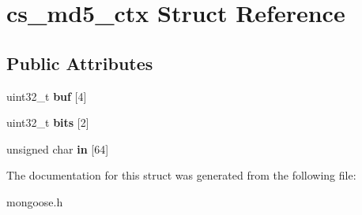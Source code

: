 \hypertarget{structcs__md5__ctx}{}\section{cs\+\_\+md5\+\_\+ctx Struct Reference}
\label{structcs__md5__ctx}
\subsection*{Public Attributes}
\begin{DoxyCompactItemize}
\item 
\mbox{\label{structcs__md5__ctx_abb0fb32f33a62efcd9dc65e3f76cf790}} 
uint32\+\_\+t {\bfseries buf} \mbox{[}4\mbox{]}
\item 
\mbox{\label{structcs__md5__ctx_a598348fc328298a1d8d0ac673d69f749}} 
uint32\+\_\+t {\bfseries bits} \mbox{[}2\mbox{]}
\item 
\mbox{\label{structcs__md5__ctx_a950ebb13dee2724d8d60d9d558d1757d}} 
unsigned char {\bfseries in} \mbox{[}64\mbox{]}
\end{DoxyCompactItemize}


The documentation for this struct was generated from the following file\+:\begin{DoxyCompactItemize}
\item 
mongoose.\+h\end{DoxyCompactItemize}
